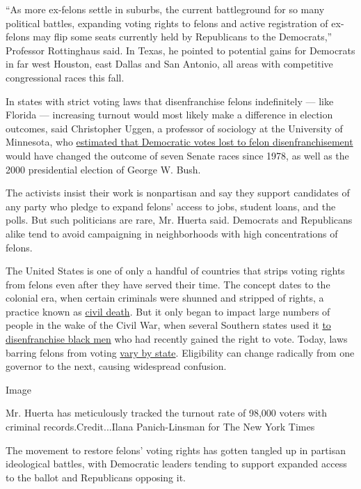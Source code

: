 ``As more ex-felons settle in suburbs, the current battleground for so
many political battles, expanding voting rights to felons and active
registration of ex-felons may flip some seats currently held by
Republicans to the Democrats,'' Professor Rottinghaus said. In Texas, he
pointed to potential gains for Democrats in far west Houston, east
Dallas and San Antonio, all areas with competitive congressional races
this fall.

In states with strict voting laws that disenfranchise felons
indefinitely --- like Florida --- increasing turnout would most likely
make a difference in election outcomes, said Christopher Uggen, a
professor of sociology at the University of Minnesota, who
\href{http://users.soc.umn.edu/~uggen/Uggen_Manza_ASR_02.pdf}{estimated
that Democratic votes lost to felon disenfranchisement} would have
changed the outcome of seven Senate races since 1978, as well as the
2000 presidential election of George W. Bush.

The activists insist their work is nonpartisan and say they support
candidates of any party who pledge to expand felons' access to jobs,
student loans, and the polls. But such politicians are rare, Mr. Huerta
said. Democrats and Republicans alike tend to avoid campaigning in
neighborhoods with high concentrations of felons.

The United States is one of only a handful of countries that strips
voting rights from felons even after they have served their time. The
concept dates to the colonial era, when certain criminals were shunned
and stripped of rights, a practice known as
\href{https://scholarship.law.upenn.edu/cgi/viewcontent.cgi?referer=https://www.google.com/\&httpsredir=1\&article=1067\&context=penn_law_review}{civil
death}. But it only began to impact large numbers of people in the wake
of the Civil War, when several Southern states used it
\href{https://www.sentencingproject.org/publications/felony-disenfranchisement-mississippi/}{to
disenfranchise black men} who had recently gained the right to vote.
Today, laws barring felons from voting
\href{https://www.nytimes3xbfgragh.onion/2018/04/21/us/felony-voting-rights-law.html}{vary
by state}. Eligibility can change radically from one governor to the
next, causing widespread confusion.

Image

Mr. Huerta has meticulously tracked the turnout rate of 98,000 voters
with criminal records.Credit...Ilana Panich-Linsman for The New York
Times

The movement to restore felons' voting rights has gotten tangled up in
partisan ideological battles, with Democratic leaders tending to support
expanded access to the ballot and Republicans opposing it.

